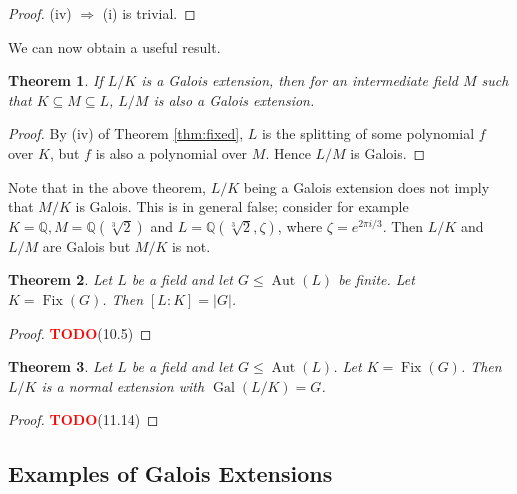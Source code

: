 \documentclass[12pt]{article}
\newtheorem{theorem}{Theorem}
\theoremstyle{definition}
\newtheorem{definition}[theorem]{Definition}
\newcommand{\Gal}{\operatorname{Gal}}
\newcommand{\Aut}{\operatorname{Aut}}
\newcommand{\Fix}{\operatorname{Fix}}
\newcommand{\Q}{\mathbb Q}
\newcommand{\TODO}{\textbf{\textcolor{red}{TODO}}}
\begin{document}
\begin{proof}
	(iv) $\Rightarrow$ (i) is trivial.
	
\end{proof}

We can now obtain a useful result.

\begin{theorem} \label{thm:galois-intermediate}
	If $L/K$ is a Galois extension, then for an intermediate field $M$ such that $K \subseteq M \subseteq L$, $L/M$ is also a Galois extension. 
\end{theorem}
\begin{proof}
	By (iv) of Theorem \ref{thm:fixed}, $L$ is the splitting of some polynomial $f$ over $K$, but $f$ is also a polynomial over $M$. Hence $L/M$ is Galois.
\end{proof}

Note that in the above theorem, $L/K$ being a Galois extension does not imply that $M/K$ is Galois. This is in general false; consider for example $K = \Q, M = \Q(\sqrt[3]{2})$ and $L = \Q(\sqrt[3]{2}, \zeta)$, where $\zeta = e^{2\pi i / 3}$. Then $L/K$ and $L/M$ are Galois but $M/K$ is not. 


\begin{theorem}
	Let $L$ be a field and let $G \le \Aut(L)$ be finite. Let $K = \Fix(G)$. Then $[L:K] =|G|$. 
\end{theorem}

\begin{proof}
	\TODO(10.5)
\end{proof}

\begin{theorem}
	Let $L$ be a field and let $G \le \Aut(L)$. Let $K = \Fix(G)$. Then $L/K$ is a normal extension with $\Gal(L/K) = G$. 
\end{theorem}

\begin{proof}
	\TODO(11.14)
\end{proof}

\subsection{Examples of Galois Extensions}
\end{document}
